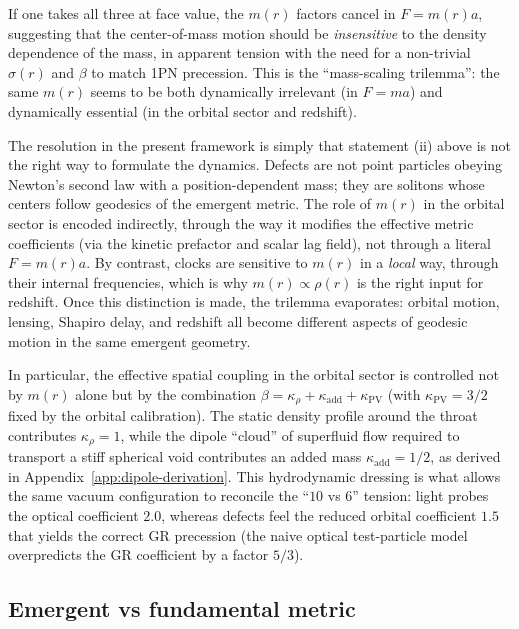 \documentclass[11pt]{article}
\begin{document}
If one takes all three at face value, the $m(r)$ factors cancel in
$F = m(r)a$, suggesting that the center-of-mass motion should be
\emph{insensitive} to the density dependence of the mass, in apparent
tension with the need for a non-trivial $\sigma(r)$ and $\beta$ to match
1PN precession.
This is the ``mass-scaling trilemma'': the same $m(r)$ seems to be both
dynamically irrelevant (in $F=ma$) and dynamically essential (in the
orbital sector and redshift).

The resolution in the present framework is simply that statement (ii)
above is not the right way to formulate the dynamics.
Defects are not point particles obeying Newton's second law with a
position-dependent mass; they are solitons whose centers follow geodesics
of the emergent metric.
The role of $m(r)$ in the orbital sector is encoded indirectly, through the
way it modifies the effective metric coefficients (via the kinetic
prefactor and scalar lag field), not through a literal $F = m(r)a$.
By contrast, clocks are sensitive to $m(r)$ in a \emph{local} way, through
their internal frequencies, which is why $m(r)\propto\rho(r)$ is the right
input for redshift.
Once this distinction is made, the trilemma evaporates: orbital motion,
lensing, Shapiro delay, and redshift all become different aspects of
geodesic motion in the same emergent geometry.

In particular, the effective spatial coupling in the orbital sector is
controlled not by $m(r)$ alone but by the combination
$\beta = \kappa_\rho + \kappa_{\mathrm{add}} + \kappa_{\mathrm{PV}}$ (with
$\kappa_{\mathrm{PV}}=3/2$ fixed by the orbital calibration).
The static density profile around the throat contributes
$\kappa_\rho = 1$, while the dipole ``cloud'' of superfluid flow
required to transport a stiff spherical void contributes an added mass
$\kappa_{\mathrm{add}} = 1/2$, as derived in
Appendix~\ref{app:dipole-derivation}.
This hydrodynamic dressing is what allows the same vacuum configuration
to reconcile the ``$10$ vs $6$'' tension: light probes the optical
coefficient $2.0$, whereas defects feel the reduced orbital coefficient
$1.5$ that yields the correct GR precession (the naive optical
test-particle model overpredicts the GR coefficient by a factor $5/3$).


\subsection{Emergent vs fundamental metric}
\label{subsec:emergent-metric}
\end{document}
